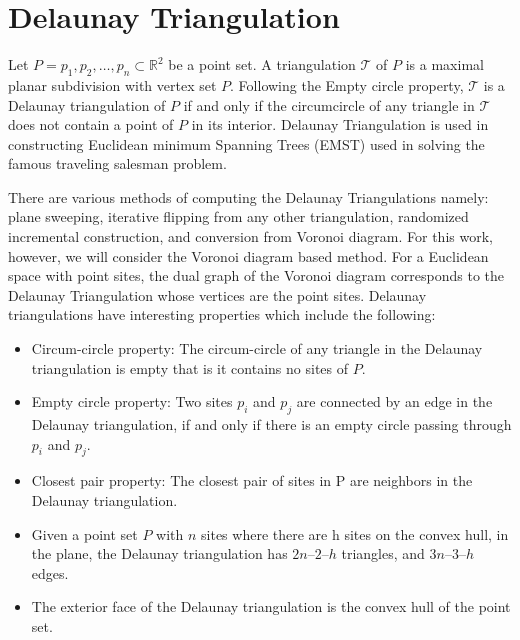 \documentclass[10pt,a4paper]{article}
\begin{document}
      \section{Delaunay Triangulation}
      Let $P={p_1, p_2, \hdots,p_n} \subset \mathbb{R}^2$ be a point set. A triangulation $\mathcal{T}$ of $P$ is a maximal planar subdivision with vertex set $P$. Following the Empty circle property, $\mathcal{T}$ is a Delaunay triangulation of $P$ if and only if the circumcircle of any triangle in $\mathcal{T}$ does not contain a point of $P$ in its interior. Delaunay Triangulation is used in constructing Euclidean minimum Spanning Trees (EMST) used in solving the famous traveling salesman problem.
      
      There are various methods of computing the Delaunay Triangulations namely: plane sweeping, iterative flipping from any other triangulation, randomized incremental construction, and conversion from Voronoi diagram. For this work, however, we will consider the Voronoi diagram based method. For a Euclidean space with point sites, the dual graph of the Voronoi diagram corresponds to the Delaunay Triangulation whose vertices are the point sites. 
      Delaunay triangulations have interesting properties which include the following:
      \begin{itemize}
      	\item Circum-circle property: The circum-circle of any triangle in the Delaunay triangulation
      	is empty that is it contains no sites of $P$.
      	\item Empty circle property: Two sites $p_i$ and $p_j$ are connected by an edge in the Delaunay
      	triangulation, if and only if there is an empty circle passing through $p_i$ and $p_j$.
      	\item Closest pair property: The closest pair of sites in P are neighbors in the Delaunay triangulation.
      	\item Given a point set $P$ with $n$ sites where there are h sites on the convex hull, in the plane, the Delaunay triangulation has $2n – 2 – h$ triangles, and $3n – 3 – h$ edges.
      	\item The exterior face of the Delaunay triangulation is the convex hull of the
      	point set.
      \end{itemize}
  
\end{document}
